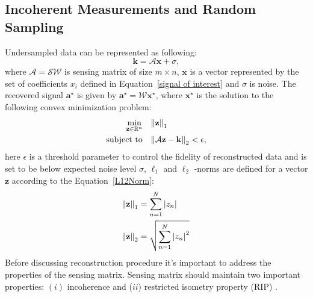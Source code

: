 \subsection{Incoherent Measurements and Random Sampling}
Undersampled data can be represented as following:
\begin{equation} \label{kspace_multicoil}
\mathbf{k} = \mathcal{A} \mathbf{x} + \sigma,
\end{equation}
where $\mathcal{A} = \mathcal{S}\mathcal{W}$ is sensing matrix of size $m \times n$, $\mathbf{x}$ is a vector represented by the set of coefficients $x_i$ defined in Equation~\ref{signal of interest} and $\sigma$ is noise. 
The recovered signal $\mathbf{a}^\star$ is given by $\mathbf{a}^\star = \mathcal{W} \mathbf{x}^\star$, where  $\mathbf{x}^\star$ is the solution to the following convex minimization problem:
\begin{equation} \label{COP}
\begin{aligned}
	\min_{\mathbf{z} \in \mathbb{R}^n} \quad &\norm{\mathbf{z}}_1 \\
	\text{subject to} \quad  &\norm{\mathcal{A} \mathbf{z}-\mathbf{k}}_2 < \epsilon,
\end{aligned}
\end{equation}
here $\epsilon$ is a threshold parameter to control the fidelity of reconstructed data and is set to be below expected noise level $\sigma$, $\ell_1$ and $\ell_2$ -norms are defined for a vector $\mathbf{z}$ according to the Equation~\ref{L12Norm}:
\begin{equation} \label{L12Norm}
\begin{aligned}
	\norm{\mathbf{z}}_1 & = \sum_{n=1}^{N}{|z_n|} \\
	\norm{\mathbf{z}}_2 & = \sqrt{\sum_{n=1}^{N}{|z_n|}^2}
\end{aligned}
\end{equation}
Before discussing reconstruction procedure it's important to address the properties of the sensing matrix. 
Sensing matrix should maintain two important properties: $(i)$ incoherence and ($ii$) restricted isometry property (RIP) \cite{Candes:2005fx}.
